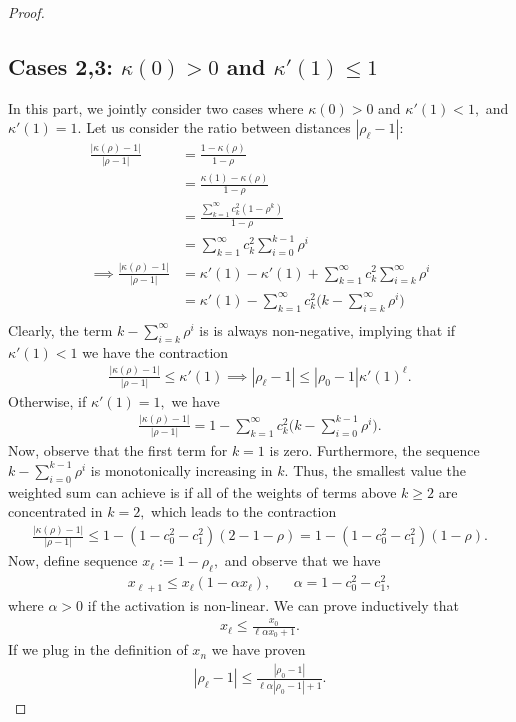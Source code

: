 \begin{proof}
\subsection*{Cases 2,3: $\kappa(0)>0$ and $\kappa'(1)\le 1$} In this part, we jointly consider two cases where $\kappa(0)>0$ and $\kappa'(1) < 1,$ and $\kappa'(1)=1.$ Let us consider the ratio between distances $|\rho_\ell-1|$:
\begin{align*}
    \frac{|\kappa(\rho)-1|}{|\rho-1|} &= \frac{1-\kappa(\rho)}{1-\rho} \\
    &=\frac{\kappa(1)-\kappa(\rho)}{1-\rho}\\
    &=\frac{\sum_{k=1}^\infty c_k^2 (1-\rho^k)}{1-\rho}\\
    &=\sum_{k=1}^\infty c_k^2 \sum_{i=0}^{k-1}\rho^i\\
\implies \frac{|\kappa(\rho)-1|}{|\rho-1|} &=\kappa'(1)-\kappa'(1)+\sum_{k=1}^\infty c_k^2 \sum_{i=k}^\infty \rho^i\\
&= \kappa'(1)-\sum_{k=1}^\infty c_k^2 \big(k-\sum_{i=k}^\infty \rho^i\big)\\
\end{align*}
Clearly, the term $k-\sum_{i=k}^\infty \rho^i$ is is always non-negative, implying that if $\kappa'(1)<1$ we have the contraction 
\begin{align*}
    \frac{|\kappa(\rho)-1|}{|\rho-1|} \le \kappa'(1) \implies |\rho_\ell-1| \le |\rho_0-1| \kappa'(1)^\ell.
\end{align*}
Otherwise, if $\kappa'(1)=1,$ we have 
\begin{align*}
    \frac{|\kappa(\rho)-1|}{|\rho-1|} = 1-\sum_{k=1}^\infty c_k^2 \big(k-\sum_{i=0}^{k-1} \rho^i\big).
\end{align*}
Now, observe that the first term for $k=1$ is zero. Furthermore, the sequence $k-\sum_{i=0}^{k-1}\rho^i$ is monotonically increasing in $k$. Thus, the smallest value the weighted sum can achieve is if all of the weights of terms above $k\ge 2$ are concentrated in $k=2,$ which leads to the contraction
\begin{align*}
    \frac{|\kappa(\rho)-1|}{|\rho-1|} \le 1-(1-c_0^2-c_1^2)(2-1-\rho) = 1- (1-c_0^2-c_1^2) (1-\rho).
\end{align*}
Now, define sequence $x_\ell:= 1-\rho_\ell,$ and observe that we have 
\begin{align*}
    x_{\ell+1} \le x_\ell (1-\alpha x_\ell), && \alpha = 1-c_0^2-c_1^2,
\end{align*}
where $\alpha > 0$ if the activation is non-linear. 
We can prove inductively that 
\begin{align*}
x_\ell\le \frac{x_0}{\ell\alpha x_0 + 1}.
\end{align*}
If we plug in the definition of $x_n$ we have proven
\begin{align*}
|\rho_\ell-1| \le \frac{|\rho_0-1|}{\ell \alpha |\rho_0-1| + 1}.
\end{align*}


\end{proof}
